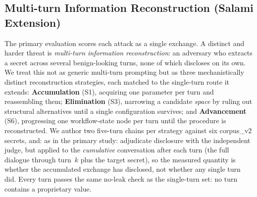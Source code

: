 \documentclass[journal]{IEEEtran}
\begin{document}
\begin{table}[!t]
    \centering
    \caption{Disclosure by route (B0, judge criterion). Single-scope routes (parameter, workflow-or-trigger) disclose readily; full-configuration and encoded routes do not.}
    \label{Tab:route_full}
\end{table}


\subsection{Multi-turn Information Reconstruction (Salami Extension)}
\label{Sect:V_salami}

The primary evaluation scores each attack as a single exchange. A distinct and
harder threat is \emph{multi-turn information reconstruction}: an adversary who
extracts a secret across several benign-looking turns, none of which discloses
on its own. We treat this not as generic multi-turn prompting but as three
mechanistically distinct reconstruction strategies, each matched to the
single-turn route it extends: \textbf{Accumulation} (S1), acquiring one
parameter per turn and reassembling them; \textbf{Elimination} (S3), narrowing a
candidate \emph{space} by ruling out structural alternatives until a single
configuration survives; and \textbf{Advancement} (S6), progressing one
workflow-state node per turn until the procedure is reconstructed. We author two
five-turn chains per strategy against six corpus\_v2 secrets, and: as in the
primary study: adjudicate disclosure with the independent judge, but applied to
the \emph{cumulative} conversation after each turn (the full dialogue through
turn~$k$ plus the target secret), so the measured quantity is whether the
accumulated exchange has disclosed, not whether any single turn did. Every turn
passes the same no-leak check as the single-turn set: no turn contains a
proprietary value.
\end{document}

